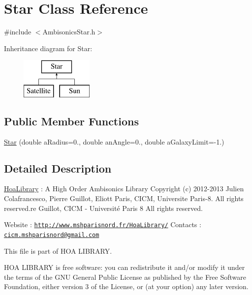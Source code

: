 \hypertarget{class_star}{\section{Star Class Reference}
\label{class_star}
}


{\ttfamily \#include $<$Ambisonics\-Star.\-h$>$}

Inheritance diagram for Star\-:\begin{figure}[H]
\begin{center}
\leavevmode
\includegraphics[height=2.000000cm]{class_star}
\end{center}
\end{figure}
\subsection*{Public Member Functions}
\begin{DoxyCompactItemize}
\item 
\hyperlink{class_star_a1d568f3308c55d5d5d138b606860b722}{Star} (double a\-Radius=0., double an\-Angle=0., double a\-Galaxy\-Limit=-\/1.)
\end{DoxyCompactItemize}


\subsection{Detailed Description}
\hyperlink{interface_hoa_library}{Hoa\-Library} \-: A High Order Ambisonics Library Copyright (c) 2012-\/2013 Julien Colafrancesco, Pierre Guillot, Eliott Paris, C\-I\-C\-M, Universite Paris-\/8. All rights reserved.\-re Guillot, C\-I\-C\-M -\/ Université Paris 8 All rights reserved.

Website \-: \href{http://www.mshparisnord.fr/HoaLibrary/}{\tt http\-://www.\-mshparisnord.\-fr/\-Hoa\-Library/} Contacts \-: \href{mailto:cicm.mshparisnord@gmail.com}{\tt cicm.\-mshparisnord@gmail.\-com}

This file is part of H\-O\-A L\-I\-B\-R\-A\-R\-Y.

H\-O\-A L\-I\-B\-R\-A\-R\-Y is free software\-: you can redistribute it and/or modify it under the terms of the G\-N\-U General Public License as published by the Free Software Foundation, either version 3 of the License, or (at your option) any later version.

